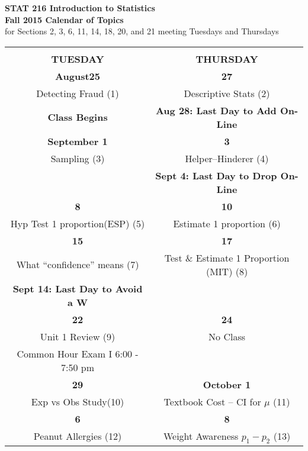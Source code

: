 \begin{center} %
\vspace{-.5in}
{\LARGE \bf STAT 216 \hspace{.05in} Introduction to Statistics}
\\
{\Large \bf Fall 2015 Calendar of Topics}\\
for Sections 2, 3, 6,  11, 14, 18, 20, and 21  meeting Tuesdays and
Thursdays
\vspace{.1in}\\
\begin{tabular}{|c|c|} \hline
 & \\
  \bf{TUESDAY} & \bf{THURSDAY} \\
 \hline \hline
   \bf{August}\hfill\bf{25} & \hfill\bf{27} \\
Detecting Fraud \small{(1)} &   Descriptive Stats \small{(2)} \\
 \small\bf{Class Begins} &   
  \small\bf{Aug 28: Last Day to Add On-Line} 
\\\hline
  \bf{September} \hfill\bf{1} & \hfill\bf{3} \\
   Sampling  \small{(3)} &  Helper--Hinderer \small{(4)} \\
     \hspace{2in}& \small\bf{Sept 4: Last Day to Drop On-Line} \\ \hline
  \hfill\bf{8} & \hfill\bf{10} \\
  Hyp Test 1 proportion(ESP) \small{(5)} &  
 Estimate 1 proportion \small{(6)}  \\
  \hline

 \hfill\bf{15} & \hfill\bf{17} \\
 What ``confidence'' means  \small{(7)}& 
 Test \& Estimate 1 Proportion (MIT) \small{(8)}\\
  \small\bf{Sept 14: Last Day to Avoid a W} &   \\
   \hline

  \hfill\bf{22} & \hfill\bf{24} \\
 Unit 1 Review  \small{(9)} & No Class \\
Common Hour Exam I 6:00 - 7:50 pm & \\
    \hline

  \hfill\bf{29}&   \bf{October} \hfill\bf{1} \\
  Exp vs Obs Study\small{(10)} & Textbook Cost -- CI for $\mu$  \small{(11)} \\ \hline

  \hfill\bf{6} & \hfill\bf{8} \\
 Peanut Allergies \small{(12)} &  
 Weight Awareness $p_1 - p_2$ \small{(13)}  \\ \hline


\end{tabular}
\end{center}

